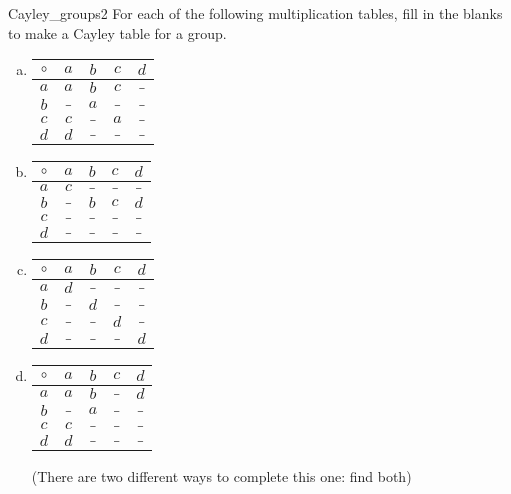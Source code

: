 \begin{exercise}{Cayley_groups2}
For each of the following multiplication tables, fill in the blanks to make a Cayley table for a group.
\begin{multicols}{2}
\begin{enumerate}[(a)]

\item
\begin{center}
\begin{tabular}{c|cccc}
$\circ$ & $a$ & $b$ & $c$ & $d$ \\
\hline
$a$ & $a$ & $b$ & $c$ & $\_$ \\
$b$ & $\_$ & $a$ & $\_$ & $\_$ \\
$c$ & $c$ & $\_$ & $a$ & $\_$ \\
$d$ & $d$ & $\_$ & $\_$ & $\_$
\end{tabular}
\end{center}
\smallskip


\item
\begin{center}
\begin{tabular}{c|cccc}
$\circ$ & $a$ & $b$ & $c$ & $d$ \\
\hline
$a$ & $c$ & $\_$ & $\_$ & $\_$ \\
$b$ & $\_$ & $b$ & $c$ & $d$ \\
$c$ & $\_$ & $\_$ & $\_$ & $\_$ \\
$d$ & $\_$ & $\_$ & $\_$ & $\_$
\end{tabular}
\end{center}
\smallskip


\item
\begin{center}
\begin{tabular}{c|cccc}
$\circ$ & $a$ & $b$ & $c$ & $d$ \\
\hline
$a$ & $d$ & $\_$ & $\_$ & $\_$ \\
$b$ & $\_$ & $d$ & $\_$ & $\_$ \\
$c$ & $\_$ & $\_$ & $d$ & $\_$ \\
$d$ & $\_$ & $\_$ & $\_$ & $d$
\end{tabular}
\end{center}
\smallskip
 
\item
\begin{center}
\begin{tabular}{c|cccc}
$\circ$ & $a$ & $b$ & $c$ & $d$ \\
\hline
$a$ & $a$ & $b$ & $\_$ & $d$ \\
$b$ & $\_$ & $a$ & $\_$ & $\_$ \\
$c$ & $c$ & $\_$ & $\_$ & $\_$ \\
$d$ & $d$ & $\_$ & $\_$ & $\_$\\
\end{tabular}
\end{center}
(There are two different ways to complete this one:  find both)


\end{enumerate}
\end{multicols}
\end{exercise}


